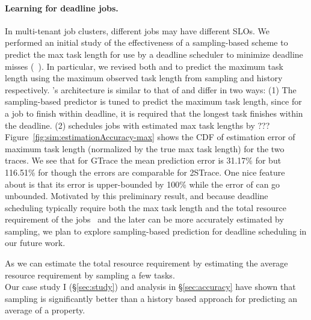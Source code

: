 \paragraph{Learning for deadline jobs.}
\label{sec:discuss:maxTaskLength}
%
In multi-tenant job clusters, different jobs may have different 
SLOs. 
We performed an initial study of the effectiveness of a sampling-based scheme
to predict the max task length for use by a deadline scheduler
to minimize deadline misses (\eg~\cite{jockey:eurosys2012}).
In particular, we revised both \slearn and \primarybasepredict to 
predict the maximum task length using
the maximum observed task length from sampling and history respectively.
%
\gsdl's architecture is similar to that of \gs and differ in two ways:
(1) The sampling-based predictor is tuned to predict
the maximum task length, since for a job to finish within deadline, it is
required that the longest task finishes within the deadline. 
 (2) \gsdl schedules jobs with estimated max task lengths by ???
\fi
%
{
Figure~\ref{fig:sim:estimationAccuracy-max} shows the CDF of
estimation error of maximum task length (normalized by the true max
task length) for the two traces. We see that for GTrace
the mean prediction error is 31.17\% for
\slearn but 116.51\% for \primarybasepredict
though the errors are comparable for 2STrace.  One nice feature
about \slearn is that its error is upper-bounded by 100\% while the
error of \primarybasepredict can go unbounded.
}
Motivated by 
this preliminary result, and because deadline scheduling typically require both the
max task length and the total resource requirement of the jobs~\cite{morpheus,3Sigma}
and the later can be more accurately estimated by sampling, we plan to
explore sampling-based prediction for deadline scheduling in our
future work.

As we can estimate the total resource
requirement by estimating the average resource requirement by sampling
a few tasks.\\ Our case study I (\S\ref{sec:study}) and analysis
in \S\ref{sec:accuracy} have shown that sampling is significantly
better than a history based approach for predicting an average of a
property.
\fi


